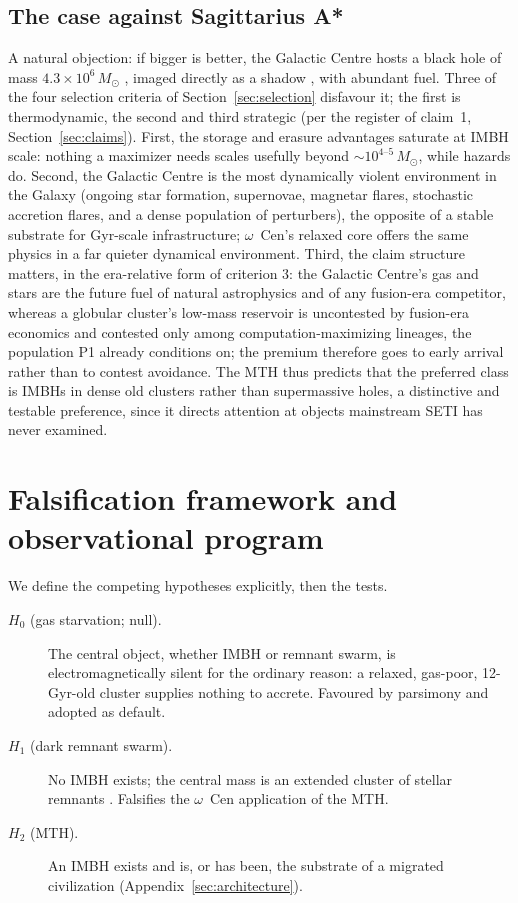 \documentclass[11pt]{article}
\newcommand{\msun}{\ensuremath{M_\odot}}
\begin{document}
\subsection{The case against Sagittarius A*}
\label{sec:whynotsgra}

A natural objection: if bigger is better, the Galactic Centre hosts a black hole of mass $4.3\times10^{6}\,\msun$ \citep{GRAVITY2022}, imaged directly as a shadow \citep{EHT2022SgrAI}, with abundant fuel. Three of the four selection criteria of Section~\ref{sec:selection} disfavour it; the first is thermodynamic, the second and third strategic (per the register of claim~1, Section~\ref{sec:claims}). First, the storage and erasure advantages saturate at IMBH scale: nothing a maximizer needs scales usefully beyond $\sim$$10^{4\text{--}5}\,\msun$, while hazards do. Second, the Galactic Centre is the most dynamically violent environment in the Galaxy (ongoing star formation, supernovae, magnetar flares, stochastic accretion flares, and a dense population of perturbers), the opposite of a stable substrate for Gyr-scale infrastructure; $\omega$~Cen's relaxed core offers the same physics in a far quieter dynamical environment. Third, the claim structure matters, in the era-relative form of criterion 3: the Galactic Centre's gas and stars are the future fuel of natural astrophysics and of any fusion-era competitor, whereas a globular cluster's low-mass reservoir is uncontested by fusion-era economics and contested only among computation-maximizing lineages, the population P1 already conditions on; the premium therefore goes to early arrival rather than to contest avoidance. The MTH thus predicts that the preferred class is IMBHs in dense old clusters rather than supermassive holes, a distinctive and testable preference, since it directs attention at objects mainstream SETI has never examined.


\section{Falsification framework and observational program}
\label{sec:falsification}

We define the competing hypotheses explicitly, then the tests.

\begin{description}
\item[$H_0$ (gas starvation; null).] The central object, whether IMBH or remnant swarm, is electromagnetically silent for the ordinary reason: a relaxed, gas-poor, 12-Gyr-old cluster supplies nothing to accrete. Favoured by parsimony and adopted as default.
\item[$H_1$ (dark remnant swarm).] No IMBH exists; the central mass is an extended cluster of stellar remnants \citep{BanaresHernandez2025,Zocchi2019,BreenHeggie2013}. Falsifies the $\omega$~Cen application of the MTH.
\item[$H_2$ (MTH).] An IMBH exists and is, or has been, the substrate of a migrated civilization (Appendix~\ref{sec:architecture}).
\end{description}
\end{document}
